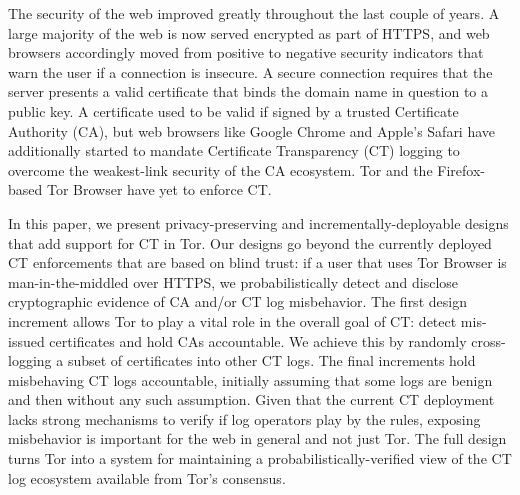 The security of the web improved greatly throughout the last couple of years.
A large majority of the web is now served encrypted as part of HTTPS, and
web browsers accordingly moved from positive to negative security indicators
that warn the user if a connection is insecure.  A secure connection requires
that the server presents a valid certificate that binds the domain name in
question to a public key.  A certificate used to be valid if signed by a trusted
Certificate Authority (CA), but web browsers like Google Chrome and
Apple's Safari have additionally started to mandate Certificate Transparency (CT)
logging to overcome the weakest-link security of the CA ecosystem.  Tor and the
Firefox-based Tor Browser have yet to enforce CT.

\hspace{12pt}
In this paper, we present privacy-preserving and incrementally-deployable
designs that add support for CT in Tor. Our designs go beyond the currently
deployed CT enforcements that are based on blind trust:
	if a user that uses Tor Browser is man-in-the-middled over HTTPS,
	we probabilistically detect and disclose cryptographic evidence of CA and/or
	CT log misbehavior.
The first design increment allows Tor to play a vital role in the overall goal
of CT:
	detect mis-issued certificates and hold CAs accountable.
We achieve this by randomly cross-logging a subset of certificates into other CT
logs.  The final increments hold misbehaving CT logs accountable, initially
assuming that some logs are benign and then without any such assumption.
Given that the current CT deployment lacks strong mechanisms to verify if log
operators play by the rules, exposing misbehavior is important for the web in
general and not just Tor.  The full design turns Tor into a system for
maintaining a probabilistically-verified view of the CT log ecosystem available
from Tor's consensus. 
